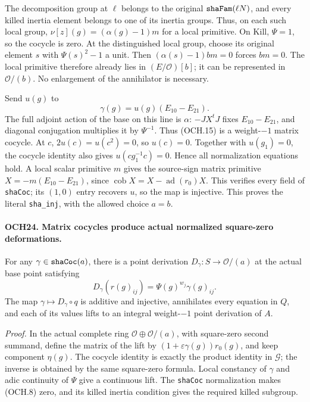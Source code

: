 \documentclass[11pt,a4paper]{article}
\numberwithin{equation}{section}
\theoremstyle{remark}\newtheorem{remark}[theorem]{Remark}
\begin{document}
The decomposition group at \(\ell\) belongs to the original
\(\texttt{sha\allowbreak Fam}(\ell N)\), and every killed inertia element
belongs to one of its inertia groups.  Thus, on each such local
group, \(\nu[z](g)=(\alpha(g)-1)m\) for a local primitive.
On \(\mathrm{Kill}\), \(\Psi=1\), so the cocycle is zero.
At the distinguished local group, choose its original element
\(s\) with \(\Psi(s)^2-1\) a unit.  Then
\((\alpha(s)-1)bm=0\) forces \(bm=0\).  The local primitive
therefore already lies in \((E/\mathcal O)[b]\); it can be
represented in \(\mathcal O/(b)\).  No enlargement of the
annihilator is necessary.

Send \(u(g)\) to
\[
              \gamma(g)=u(g)(E_{10}-E_{21}).
 \tag{OCH.15}
\]
The full adjoint action of the base on this line is \(\alpha\):
\(-JX^tJ\) fixes \(E_{10}-E_{21}\), and diagonal
conjugation multiplies it by \(\Psi^{-1}\).
Thus (OCH.15) is a weight-\(-1\) matrix cocycle.
At \(c\), \(2u(c)=u(c^2)=0\), so \(u(c)=0\).
Together with \(u(g_1)=0\), the cocycle identity also gives
\(u(cg_1^{-1}c)=0\).  Hence all normalization equations hold.
A local scalar primitive \(m\) gives the source-sign matrix
primitive \(X=-m(E_{10}-E_{21})\), since
\(\operatorname{cob}X=X-\operatorname{ad}(r_0)X\).
This verifies every field of \texttt{sha\allowbreak Coc}; its \((1,0)\)
entry recovers \(u\), so the map is injective.  This proves the
literal \texttt{sha\_\allowbreak inj}, with the allowed choice \(a=b\).

\paragraph{OCH24. Matrix cocycles produce actual normalized square-zero deformations.}
\label{claim:OCH24}
For any \(\gamma\in\texttt{sha\allowbreak Coc}(a)\), there is a point
derivation \(D_\gamma:S\to\mathcal O/(a)\) at the actual
base point satisfying
\[
 D_\gamma(r(g)_{ij})=\Psi(g)^{w_j}\gamma(g)_{ij}.
 \tag{OCH.16}
\]
The map \(\gamma\mapsto D_\gamma\circ q\) is additive and
injective, annihilates every equation in \(Q\), and each of
its values lifts to an integral weight-\(-1\) point derivation
of \(A\).

\emph{Proof.}
In the actual complete ring
\(\mathcal O\oplus\mathcal O/(a)\), with square-zero second
summand, define the matrix of the lift by
\((1+\varepsilon\gamma(g))r_0(g)\), and keep component
\(\eta(g)\).  The cocycle identity is exactly the product
identity in \(\mathcal G\); the inverse is obtained by the
same square-zero formula.  Local constancy of \(\gamma\) and
adic continuity of \(\Psi\) give a continuous lift.  The
\texttt{sha\allowbreak Coc} normalization makes (OCH.8) zero, and its killed
inertia condition gives the required killed subgroup.
\end{document}
